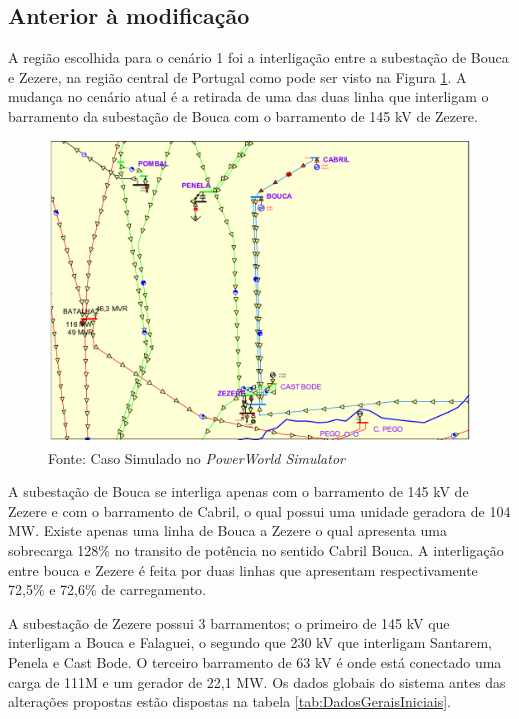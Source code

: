 \subsection{Anterior à modificação}

A região escolhida para o cenário 1 foi a interligação entre a subestação de Bouca e Zezere, na região central de Portugal como pode ser visto na Figura \ref{fig:caso1}. A mudança no cenário atual é a retirada de uma das duas linha que interligam o barramento da subestação de Bouca com o barramento de 145 kV de Zezere.

\vspace{3.3mm}

\begin{figure}[H]
	\centering
	\captionsetup{width=1\textwidth, font=footnotesize, textfont=bf}	
	\includegraphics[width=1\linewidth]{img/caso1.pdf}
	\caption{Cenário 1, anterior à modificação}
	\vspace{-3.5mm}
	\caption*{Fonte: Caso Simulado no \textit{PowerWorld\textsuperscript{\textregistered} Simulator}}
	\label{fig:caso1}
\end{figure}

A subestação de Bouca se interliga apenas com o barramento de 145 kV de Zezere e com o barramento de Cabril, o qual possui uma unidade geradora de 104 MW. Existe apenas uma linha de Bouca a Zezere o qual apresenta uma sobrecarga 128\% no transito de potência no sentido Cabril Bouca. A interligação entre bouca e Zezere é feita por duas linhas que apresentam respectivamente  72,5\% e 72,6\% de carregamento.

A subestação de Zezere possui 3 barramentos; o primeiro de 145 kV que interligam a Bouca e Falaguei, o segundo que 230 kV que interligam Santarem, Penela e Cast Bode. O terceiro barramento de 63 kV é onde está conectado uma carga de 111M e um gerador de 22,1 MW. Os dados globais do sistema antes das alterações propostas estão dispostas na tabela \ref{tab:DadosGeraisIniciais}.

